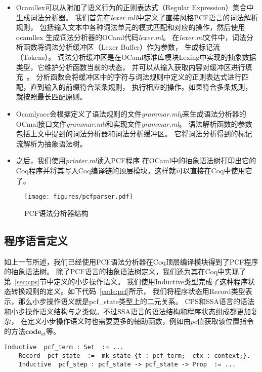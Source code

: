 \begin{itemize}
    \item Ocamllex可以从附加了语义行为的正则表达式（Regular Expression）集合中生成词法分析器。
    我们首先在\textit{lexer.mll}中定义了直接风格PCF语言的词法解析规则，
    包括输入文本中各种词法单元的模式匹配和对应的操作，然后使用ocamllex
    生成词法分析器的OCaml代码\textit{lexer.ml}。
    在\textit{lexer.ml}文件中，词法分析函数将词法分析缓冲区（Lexer Buffer）作为参数，
    生成标记流（Tokens）。
    词法分析缓冲区是在OCaml标准库模块Lexing中实现的抽象数据类型，它维护分析函数当前的状态，
    并可以从输入获取内容对缓冲区进行填充~\cite{leroy2021ocaml}。
    分析函数会将缓冲区中的字符与词法规则中定义的正则表达式进行匹配，直到输入的前缀符合某条规则，
    执行相应的操作。如果符合多条规则，就按照最长匹配原则。
    \item Ocamlyacc会根据定义了语法规则的文件\textit{grammar.mly}来生成语法分析器的
    OCmal接口文件\textit{grammar.mli}和实现文件\textit{grammar.ml}。
    语法解析函数的参数包括上文中提到的词法分析器和词法分析缓冲区。
    它将词法分析得到的标记流解析为抽象语法树。
    \item 之后，我们使用\textit{printer.ml}读入PCF程序
    在OCaml中的抽象语法树打印出它的Coq程序并将其写入Coq编译链的顶层模块，这样就可以直接在Coq中使用它了。
\end{itemize}

\begin{figure}[htbp]
    \centering
    \vspace{2ex}
    \texttt{[image: figures/pcfparser.pdf]}
    \caption{PCF语法分析器结构}\label{fig:parser}
\end{figure}

\subsection{程序语言定义}

如上一节所述，我们已经使用PCF语法分析器在Coq顶层编译模块得到了PCF程序的抽象语法树。
除了PCF语言的抽象语法树定义，我们还为其在Coq中实现了第~\ref{sec:cps}节中定义的小步操作语义。
我们使用Inductive类型完成了这种程序状态转换规则的定义。如下代码~\ref{code:pcf}所示，
我们将程序状态用Record类型表示，那么小步操作语义就是pcf\_state类型上的二元关系。
CPS和SSA语言的语法和小步操作语义结构与之类似。不过SSA语言的语法结构和程序状态组成都更加复杂，
在定义小步操作语义时也需要更多的辅助函数，例如由$pc$值获取该位置指令的方法$\mathbf{code}_{at}$等。

\vspace{1ex}
\begin{lstlisting}[language=Coq, caption=Coq中的PCF语法与语义定义结构, label=code:pcf]
    Inductive  pcf_term : Set  := ...
    Record  pcf_state  :=  mk_state {t : pcf_term;  ctx : context;}.
    Inductive  pcf_step : pcf_state -> pcf_state -> Prop  := ...
\end{lstlisting}

